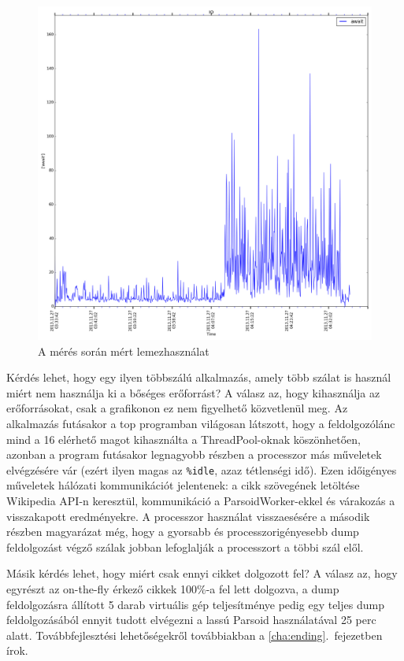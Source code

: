 \begin{figure}[htb]
\centering
\includegraphics[scale=0.3]{img/measurement_io}
\caption{A mérés során mért lemezhasználat}
\label{fig:measurement_io}
\end{figure}

Kérdés lehet, hogy egy ilyen többszálú alkalmazás, amely több szálat is használ miért nem használja ki a bőséges erőforrást? A válasz az, hogy kihasználja az erőforrásokat, csak a grafikonon ez nem figyelhető közvetlenül meg. Az alkalmazás futásakor a top programban világosan látszott, hogy a feldolgozólánc mind a 16 elérhető magot kihasználta a ThreadPool-oknak köszönhetően, azonban a program futásakor legnagyobb részben a processzor más műveletek elvégzésére vár (ezért ilyen magas az \texttt{\%idle}, azaz tétlenségi idő). Ezen időigényes műveletek hálózati kommunikációt jelentenek: a cikk szövegének letöltése Wikipedia API-n keresztül, kommunikáció a ParsoidWorker-ekkel és várakozás a visszakapott eredményekre. A processzor használat visszaesésére a második részben magyarázat még, hogy a gyorsabb és processzorigényesebb dump feldolgozást végző szálak jobban lefoglalják a processzort a többi szál elől.

Másik kérdés lehet, hogy miért csak ennyi cikket dolgozott fel? A válasz az, hogy egyrészt az on-the-fly érkező cikkek 100\%-a fel lett dolgozva, a dump feldolgozásra állított 5 darab virtuális gép teljesítménye pedig egy teljes dump feldolgozásából ennyit tudott elvégezni a lassú Parsoid használatával 25 perc alatt. Továbbfejlesztési lehetőségekről továbbiakban a \ref{cha:ending}.~fejezetben írok.

